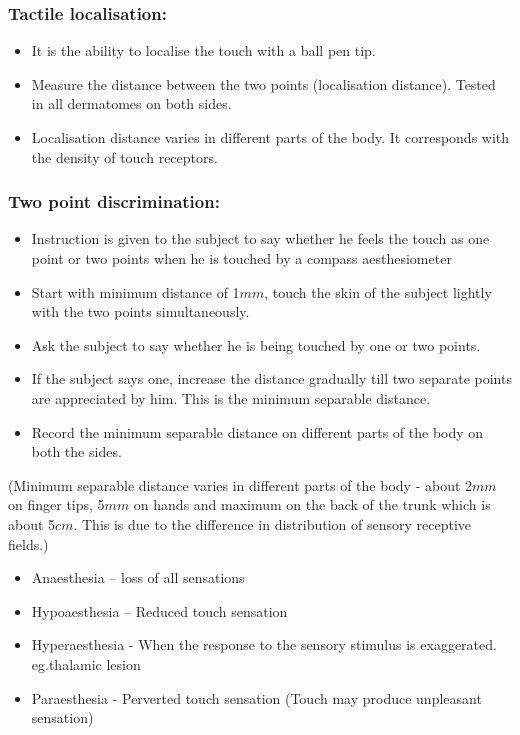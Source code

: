 \documentclass[a4paper,12pt,openany,twoside]{book}
\begin{document}
\subsubsection*{Tactile localisation:}
\begin{itemize}
		\itemsep0em
\item{It is the ability to localise the touch with a ball pen tip.}
\item{Measure the distance between the two points (localisation distance).  Tested in all dermatomes on both sides.}
\item{Localisation distance varies in different parts of the body. It corresponds with the density of touch receptors.}
\end{itemize}

\subsubsection*{Two point discrimination:}
\begin{itemize}
		\itemsep0em
\item{Instruction is given to the subject to say whether he feels the touch as one point or two points when he is touched by a compass aesthesiometer}
\item{Start with minimum distance of 1$mm$, touch the skin of the subject lightly with the two points simultaneously.}
\item{Ask the subject to say whether he is being touched by one or two points.}
\item{If the subject says one, increase the distance gradually till two separate points are appreciated by him. This is the minimum separable distance.}
\item{Record the minimum separable distance on different parts of the body on both the sides.}
\end{itemize}
\par
(Minimum separable distance varies in different parts of the body - about 2$mm$ on finger tips, 5$mm$ on hands and maximum on the back of the trunk which is about 5$cm$. This is due to the difference in distribution of sensory receptive fields.)
\begin{itemize}
		\itemsep0em
\item[]Anaesthesia 	– loss of all sensations
\item[]Hypoaesthesia 	– Reduced touch sensation
\item[]Hyperaesthesia 	- When the response to the sensory stimulus is exaggerated.  eg.thalamic lesion
\item[]Paraesthesia 	- Perverted touch sensation (Touch may produce unpleasant 				sensation)
\end{itemize}
\end{document}
